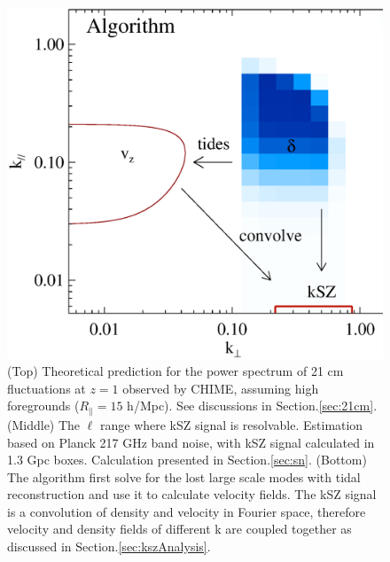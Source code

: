 \begin{figure}[tbp]
\begin{minipage}[t]{\linewidth}
\includegraphics[width=\textwidth]{figure/demo_convolution.eps}
\vspace{-0.6cm}
\end{minipage}
\caption{
(Top) Theoretical prediction for the power spectrum of 21 cm fluctuations at $z=1$ observed by CHIME, assuming high foregrounds ($R_\parallel=15$ h/Mpc). See discussions in Section.\ref{sec:21cm}. (Middle) 
The $\ell$ range where kSZ signal is resolvable. 
Estimation based on Planck 217 GHz band noise, with 
kSZ signal calculated in 1.3 Gpc boxes. 
Calculation presented in Section.\ref{sec:sn}.
(Bottom) The algorithm first solve for the lost large scale modes 
with tidal reconstruction 
and use it to calculate velocity fields.   
The kSZ signal is a convolution of density and velocity in Fourier space, 
therefore velocity and density fields of different k are coupled together 
as discussed in Section.\ref{sec:kszAnalysis}. 
}
\end{figure}
